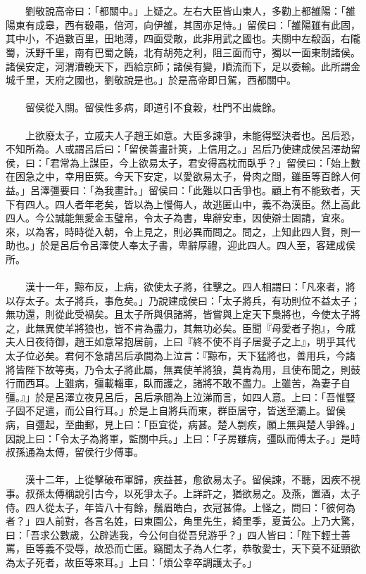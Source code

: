 \\\\
　　劉敬說高帝曰：「都關中。」上疑之。左右大臣皆山東人，多勸上都雒陽：「雒陽東有成皋，西有殽黽，倍河，向伊雒，其固亦足恃。」留侯曰：「雒陽雖有此固，其中小，不過數百里，田地薄，四面受敵，此非用武之國也。夫關中左殽函，右隴蜀，沃野千里，南有巴蜀之饒，北有胡苑之利，阻三面而守，獨以一面東制諸侯。諸侯安定，河渭漕輓天下，西給京師；諸侯有變，順流而下，足以委輸。此所謂金城千里，天府之國也，劉敬說是也。」於是高帝即日駕，西都關中。
\\\\
　　留侯從入關。留侯性多病，即道引不食穀，杜門不出歲餘。
\\\\
　　上欲廢太子，立戚夫人子趙王如意。大臣多諫爭，未能得堅決者也。呂后恐，不知所為。人或謂呂后曰：「留侯善畫計筴，上信用之。」呂后乃使建成侯呂澤劫留侯，曰：「君常為上謀臣，今上欲易太子，君安得高枕而臥乎？」留侯曰：「始上數在困急之中，幸用臣筴。今天下安定，以愛欲易太子，骨肉之間，雖臣等百餘人何益。」呂澤彊要曰：「為我畫計。」留侯曰：「此難以口舌爭也。顧上有不能致者，天下有四人。四人者年老矣，皆以為上慢侮人，故逃匿山中，義不為漢臣。然上高此四人。今公誠能無愛金玉璧帛，令太子為書，卑辭安車，因使辯士固請，宜來。來，以為客，時時從入朝，令上見之，則必異而問之。問之，上知此四人賢，則一助也。」於是呂后令呂澤使人奉太子書，卑辭厚禮，迎此四人。四人至，客建成侯所。
\\\\
　　漢十一年，黥布反，上病，欲使太子將，往擊之。四人相謂曰：「凡來者，將以存太子。太子將兵，事危矣。」乃說建成侯曰：「太子將兵，有功則位不益太子；無功還，則從此受禍矣。且太子所與俱諸將，皆嘗與上定天下梟將也，今使太子將之，此無異使羊將狼也，皆不肯為盡力，其無功必矣。臣聞『母愛者子抱』，今戚夫人日夜待御，趙王如意常抱居前，上曰『終不使不肖子居愛子之上』，明乎其代太子位必矣。君何不急請呂后承間為上泣言：『黥布，天下猛將也，善用兵，今諸將皆陛下故等夷，乃令太子將此屬，無異使羊將狼，莫肯為用，且使布聞之，則鼓行而西耳。上雖病，彊載輜車，臥而護之，諸將不敢不盡力。上雖苦，為妻子自彊。』」於是呂澤立夜見呂后，呂后承間為上泣涕而言，如四人意。上曰：「吾惟豎子固不足遣，而公自行耳。」於是上自將兵而東，群臣居守，皆送至灞上。留侯病，自彊起，至曲郵，見上曰：「臣宜從，病甚。楚人剽疾，願上無與楚人爭鋒。」因說上曰：「令太子為將軍，監關中兵。」上曰：「子房雖病，彊臥而傅太子。」是時叔孫通為太傅，留侯行少傅事。
\\\\
　　漢十二年，上從擊破布軍歸，疾益甚，愈欲易太子。留侯諫，不聽，因疾不視事。叔孫太傅稱說引古今，以死爭太子。上詳許之，猶欲易之。及燕，置酒，太子侍。四人從太子，年皆八十有餘，鬚眉皓白，衣冠甚偉。上怪之，問曰：「彼何為者？」四人前對，各言名姓，曰東園公，角里先生，綺里季，夏黃公。上乃大驚，曰：「吾求公數歲，公辟逃我，今公何自從吾兒游乎？」四人皆曰：「陛下輕士善罵，臣等義不受辱，故恐而亡匿。竊聞太子為人仁孝，恭敬愛士，天下莫不延頸欲為太子死者，故臣等來耳。」上曰：「煩公幸卒調護太子。」
